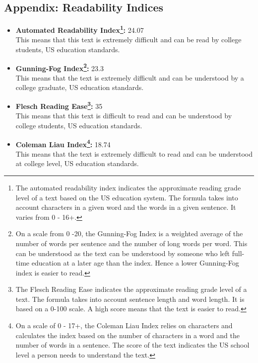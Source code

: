 \documentclass[12pt]{article} %
\begin{document}
\begin{appendices}
\section{Appendix: Readability Indices}
    \begin{itemize}
        \item \textbf{Automated Readability Index\footnote{The automated readability index indicates the approximate reading grade level of a text based on the US education system. The formula takes into account characters in a given word and the words in a given sentence. It varies from 0 - 16+.}:} 24.07  
        \\This means that this text is extremely difficult and can be read by college students, US education standards.
        \item \textbf{Gunning-Fog Index\footnote{On a scale from 0 -20, the Gunning-Fog Index is a weighted average of the number of words per sentence and the number of long words per word. This can be understood as the text can be understood by someone who left full-time education at a later age than the index. Hence a lower Gunning-Fog index is easier to read.}:} 23.3
        \\This means that the text is extremely difficult and can be understood by a college graduate, US education standards.
        \item \textbf{Flesch Reading Ease\footnote{The Flesch Reading Ease indicates the approximate reading grade level of a text. The formula takes into account sentence length and word length. It is based on a 0-100 scale. A high score means that the text is easier to read.}:} 35 \\This means that this text is difficult to read and can be understood by college students, US education standards.
        \item \textbf{Coleman Liau Index\footnote{On a scale of 0 - 17+, the Coleman Liau Index relies on characters and calculates the index based on the number of characters in a word and the number of words in a sentence. The score of the text indicates the US school level a person needs to understand the text.}:} 18.74
        \\This means that the text is extremely difficult to read and can be understood at college level, US education standards.

    \end{itemize}
\end{appendices}
\clearpage
\end{document}
